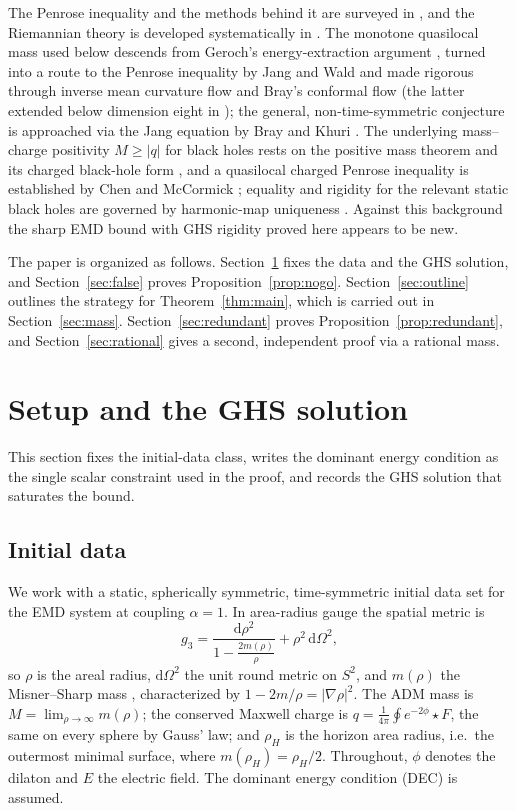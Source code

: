 \documentclass[11pt]{article}
\theoremstyle{plain}
\theoremstyle{definition}
\newcommand{\dd}{\mathrm{d}}
\newcommand{\rH}{\rho_{\!H}}
\begin{document}
The Penrose inequality and the methods behind it are surveyed in \cite{Mars}, and the Riemannian theory is
developed systematically in \cite{LeeBook}. The monotone quasilocal mass used below descends from Geroch's
energy-extraction argument \cite{Geroch}, turned into a route to the Penrose inequality by Jang and Wald
\cite{JangWald} and made rigorous through inverse mean curvature flow \cite{HuiskenIlmanen} and Bray's conformal
flow \cite{Bray} (the latter extended below dimension eight in \cite{BrayLee}); the general, non-time-symmetric
conjecture is approached via the Jang equation by Bray and Khuri \cite{BrayKhuri}. The underlying mass--charge
positivity $M\ge|q|$ for black holes rests on the positive mass theorem \cite{SchoenYau,Witten} and its charged
black-hole form \cite{GHHP}, and a quasilocal charged Penrose inequality is established by Chen and McCormick
\cite{ChenMcCormick}; equality and rigidity for the relevant static black holes are governed by harmonic-map
uniqueness \cite{Weinstein,MarsSimon}. Against this background the sharp EMD bound with GHS rigidity proved here
appears to be new.

The paper is organized as follows. Section~\ref{sec:setup} fixes the data and the GHS solution, and
Section~\ref{sec:false} proves Proposition~\ref{prop:nogo}. Section~\ref{sec:outline} outlines the strategy for
Theorem~\ref{thm:main}, which is carried out in Section~\ref{sec:mass}. Section~\ref{sec:redundant} proves
Proposition~\ref{prop:redundant}, and Section~\ref{sec:rational} gives a second, independent proof via a
rational mass.

\section{Setup and the GHS solution}\label{sec:setup}

This section fixes the initial-data class, writes the dominant energy condition as the single scalar constraint
used in the proof, and records the GHS solution that saturates the bound.

\subsection{Initial data}\label{sec:data}

We work with a static, spherically symmetric, time-symmetric initial data set for the EMD system at coupling
$\alpha=1$. In area-radius gauge the spatial metric is
\begin{equation*}
  g_3=\frac{\dd\rho^2}{1-\tfrac{2m(\rho)}{\rho}}+\rho^2\,\dd\Omega^2 ,
\end{equation*}
so $\rho$ is the areal radius, $\dd\Omega^2$ the unit round metric on $S^2$, and $m(\rho)$ the Misner--Sharp
mass \cite{MisnerSharp}, characterized by $1-2m/\rho=|\nabla\rho|^2$. The ADM mass is $M=\lim_{\rho\to\infty}
m(\rho)$; the conserved Maxwell charge is $q=\frac{1}{4\pi}\oint e^{-2\phi}\star F$, the same on every sphere by
Gauss' law; and $\rH$ is the horizon area radius, i.e.\ the outermost minimal surface, where $m(\rH)=\rH/2$.
Throughout, $\phi$ denotes the dilaton and $E$ the electric field. The dominant energy condition (DEC) is
assumed.
\end{document}
